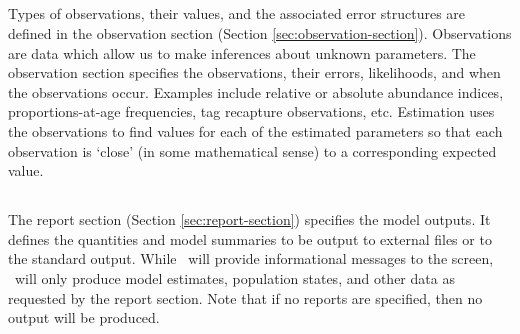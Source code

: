 \subsection{}
\CH
Types of observations, their values, and the associated error structures are defined in the observation section (Section \ref{sec:observation-section}). Observations are data which allow us to make inferences about unknown parameters. The observation section specifies the observations, their errors, likelihoods, and when the observations occur. Examples include relative or absolute abundance indices, proportions-at-age frequencies, tag recapture observations, etc. Estimation uses the observations to find values for each of the estimated parameters so that each observation is `close' (in some mathematical sense) to a corresponding expected value. 

\subsection{}
The report section (Section \ref{sec:report-section}) specifies the model outputs. It defines the quantities and model summaries to be output to external files or to the standard output. While \CNAME\ will provide informational messages to the screen, \CNAME\ will only produce model estimates, population states, and other data as requested by the report section. Note that if no reports are specified, then no output will be produced.
